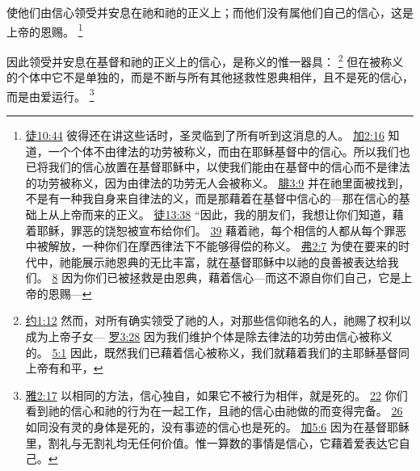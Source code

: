 \documentclass[12pt, a4paper, oneside]{ctexart}
\newcounter{parnum}[section]
\newcommand{\N}{%
   \noindent\refstepcounter{parnum}%
    \makebox[\parindent][l]{\textbf{\arabic{parnum}.}}}
\begin{document}
	使他们由信心领受并安息在祂和祂的正义上；而他们没有属他们自己的信心，这是上帝的恩赐。
	\footnote {
		\href{https://biblehub.com/acts/10-44.htm}{徒10:44} 彼得还在讲这些话时，圣灵临到了所有听到这消息的人。
		\href{https://biblehub.com/galatians/2-16.htm}{加2:16} 知道，一个个体不由律法的功劳被称义，而由在耶稣基督中的信心。所以我们也已将我们的信心放置在基督耶稣中，以使我们能由在基督中的信心而不是律法的功劳被称义，因为由律法的功劳无人会被称义。
		\href{https://biblehub.com/philippians/3-9.htm}{腓3:9} 并在祂里面被找到，不是有一种我自身来自律法的义，而是那藉着在基督中信心的---那在信心的基础上从上帝而来的正义。
		\href{https://biblehub.com/acts/13-38.htm}{徒13:38} “因此，我的朋友们，我想让你们知道，藉着耶稣，罪恶的饶恕被宣布给你们。
		\href{https://biblehub.com/acts/13-39.htm}{39} 藉着祂，每个相信的人都从每个罪恶中被解放，一种你们在摩西律法下不能够得偿的称义。
		\href{https://biblehub.com/ephesians/2-7.htm}{弗2:7} 为使在要来的时代中，祂能展示祂恩典的无比丰富，就在基督耶稣中以祂的良善被表达给我们。
		\href{https://biblehub.com/ephesians/2-8.htm}{8} 因为你们已被拯救是由恩典，藉着信心---而这不源自你们自己，它是上帝的恩赐---
	}

\N 因此领受并安息在基督和祂的正义上的信心，是称义的惟一器具：
	\footnote {
		\href{https://biblehub.com/john/1-12.htm}{约1:12} 然而，对所有确实领受了祂的人，对那些信仰祂名的人，祂赐了权利以成为上帝子女---
		\href{https://biblehub.com/romans/3-28.htm}{罗3:28} 因为我们维护个体是除去律法的功劳由信心被称义的。
        \href{https://biblehub.com/romans/5-1.htm}{5:1} 因此，既然我们已藉着信心被称义，我们就藉着我们的主耶稣基督同上帝有和平，
	}
	但在被称义的个体中它不是单独的，而是不断与所有其他拯救性恩典相伴，且不是死的信心，而是由爱运行。
	\footnote {
		\href{https://biblehub.com/james/2-17.htm}{雅2:17} 以相同的方法，信心独自，如果它不被行为相伴，就是死的。
		\href{https://biblehub.com/james/2-22.htm}{22} 你们看到祂的信心和祂的行为在一起工作，且祂的信心由祂做的而变得完备。
		\href{https://biblehub.com/james/2-26.htm}{26} 如同没有灵的身体是死的，没有事迹的信心也是死的。
		\href{https://biblehub.com/galatians/5-6.htm}{加5:6} 因为在基督耶稣里，割礼与无割礼均无任何价值。惟一算数的事情是信心，它藉着爱表达它自己。
	}
\end{document}
